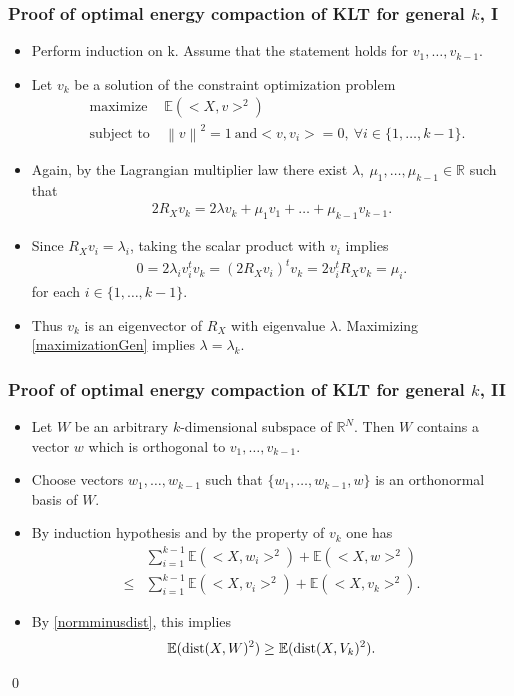 \begin{frame}\frametitle{Proof of optimal energy compaction of KLT  for general $k$, I }
\begin{itemize}
\item Perform induction on k. Assume that the statement holds for $v_1,\dots,v_{k-1}$. 

\item Let $v_k$ be a solution of the constraint optimization problem 
\begin{align}\label{maximizationGen}
 & \text{maximize} &\mathbb{E}(<X,v>^2) \nonumber \\ & \text{subject to}\: &\left\|v\right\|^2=1\: \text{and}<v,v_i>=0, \:\forall i\in\{1,\dots,k-1\}.
\end{align}
\item Again, by the Lagrangian multiplier law there exist $\lambda,\:\mu_1,\dots,\mu_{k-1}\in\mathbb{R}$ such that
\begin{align*}
2R_Xv_k=2\lambda v_k+\mu_1v_1+\dots+\mu_{k-1}v_{k-1}. 
\end{align*}
\item Since $R_Xv_i=\lambda_i$, taking the scalar product with $v_i$ implies 
\begin{align*}
0=2\lambda_iv_i^tv_k=(2R_Xv_i)^tv_k=2v_i^tR_Xv_k=\mu_i.
\end{align*}
for each $i\in\{1,\dots,k-1\}$. 
\item Thus $v_k$ is an eigenvector of $R_X$ with eigenvalue $\lambda$. Maximizing \eqref{maximizationGen} implies 
$\lambda=\lambda_k$. 
\end{itemize}
\end{frame}

\begin{frame}\frametitle{Proof of optimal energy compaction of KLT  for general $k$, II}
\begin{itemize}
\item Let $W$ be an arbitrary $k$-dimensional subspace of $\mathbb{R}^N$. Then $W$ contains a vector $w$ which is orthogonal to $v_1,\dots,v_{k-1}$. 
\item Choose vectors $w_1,\dots,w_{k-1}$ such that $\{w_1,\dots,w_{k-1},w\}$ is an orthonormal basis of $W$. 
\item By induction hypothesis and 
by the property of $v_k$ one has 
\begin{align*}
&\sum_{i=1}^{k-1}\mathbb{E}(<X,w_i>^2)+\mathbb{E}(<X,w>^2)\\
\leq& \sum_{i=1}^{k-1}\mathbb{E}(<X,v_i>^2)+\mathbb{E}(<X,v_k>^2). 
\end{align*}
\item By \eqref{normminusdist}, this implies
\begin{align*}
\mathbb{E}(\operatorname{dist}(X,W)^2)\geq \mathbb{E}(\operatorname{dist}(X,V_k)^2).
\end{align*}
\end{itemize}
\qed
\end{frame}

